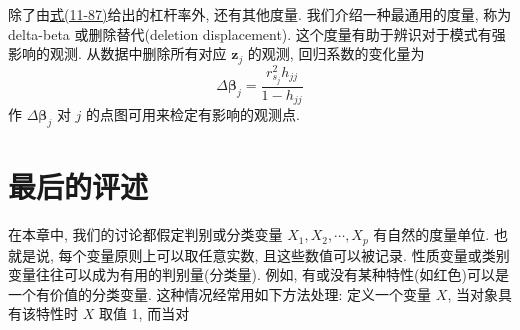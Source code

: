 除了由\hyperref[eq:11-87]{式(11-87)}给出的杠杆率外, 还有其他度量. 我们介绍一种最通用的度量, 称为 delta-beta 或删除替代(deletion displacement). 这个度量有助于辨识对于模式有强影响的观测. 从数据中删除所有对应 $\mathbf{z}_j$ 的观测, 回归系数的变化量为
\label{eq:11-88}
\begin{equation}
\Delta\boldsymbol{\beta}_j=\frac{r_{s_j}^2h_{jj}}{1-h_{jj}}
\tag{11-88}
\end{equation}
作 $\Delta\boldsymbol{\beta}_j$ 对 $j$ 的点图可用来检定有影响的观测点.

\section{最后的评述}  %
\label{sec:11.9}


在本章中, 我们的讨论都假定判别或分类变量 $X_1,X_2,\cdots,X_p$ 有自然的度量单位. 也就是说, 每个变量原则上可以取任意实数, 且这些数值可以被记录. 性质变量或类别变量往往可以成为有用的判别量(分类量). 例如, 有或没有某种特性(如红色)可以是一个有价值的分类变量. 这种情况经常用如下方法处理: 定义一个变量 $X$, 当对象具有该特性时 $X$ 取值 1, 而当对
